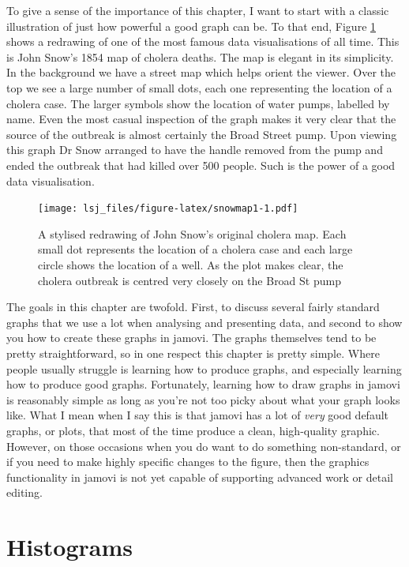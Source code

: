 \documentclass[
]{book}
\begin{document}
To give a sense of the importance of this chapter, I want to start with a classic illustration of just how powerful a good graph can be. To that end, Figure \ref{fig:snowmap1} shows a redrawing of one of the most famous data visualisations of all time. This is John Snow's 1854 map of cholera deaths. The map is elegant in its simplicity. In the background we have a street map which helps orient the viewer. Over the top we see a large number of small dots, each one representing the location of a cholera case. The larger symbols show the location of water pumps, labelled by name. Even the most casual inspection of the graph makes it very clear that the source of the outbreak is almost certainly the Broad Street pump. Upon viewing this graph Dr Snow arranged to have the handle removed from the pump and ended the outbreak that had killed over 500 people. Such is the power of a good data visualisation.

\begin{figure}
\centering
\texttt{[image: lsj\_files/figure-latex/snowmap1-1.pdf]}
\caption{\label{fig:snowmap1}A stylised redrawing of John Snow's original cholera map. Each small dot represents the location of a cholera case and each large circle shows the location of a well. As the plot makes clear, the cholera outbreak is centred very closely on the Broad St pump}
\end{figure}

The goals in this chapter are twofold. First, to discuss several fairly standard graphs that we use a lot when analysing and presenting data, and second to show you how to create these graphs in jamovi. The graphs themselves tend to be pretty straightforward, so in one respect this chapter is pretty simple. Where people usually struggle is learning how to produce graphs, and especially learning how to produce good graphs. Fortunately, learning how to draw graphs in jamovi is reasonably simple as long as you're not too picky about what your graph looks like. What I mean when I say this is that jamovi has a lot of \emph{very} good default graphs, or plots, that most of the time produce a clean, high-quality graphic. However, on those occasions when you do want to do something non-standard, or if you need to make highly specific changes to the figure, then the graphics functionality in jamovi is not yet capable of supporting advanced work or detail editing.

\hypertarget{hist}{%
\section{Histograms}\label{hist}}
\end{document}
